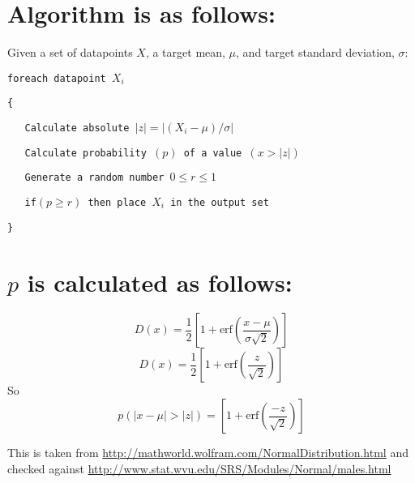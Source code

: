 \documentclass{article}
\begin{document}
\section{Algorithm is as follows:}
Given a set of datapoints $X$, a target mean, $\mu$, and target
standard deviation, $\sigma$:

\texttt{foreach datapoint $X_i$}

\texttt{\{}

\texttt{\ \ \ Calculate absolute $|z| = |(X_i - \mu) / \sigma|$}

\texttt{\ \ \ Calculate probability $(p)$ of a value $(x > |z|)$}

\texttt{\ \ \ Generate a random number $0\le r\le 1$}

\texttt{\ \ \ if$(p \ge r)$ then place $X_i$ in the output set}

\texttt{\}}

\section{$p$ is calculated as follows:}
\begin{equation}
   D(x) = \frac{1}{2}\left[1 + 
                     \mbox{erf}\left(\frac{x-\mu}{\sigma\sqrt{2}}\right)\right]
\end{equation}
\begin{equation}
   D(x)  = \frac{1}{2}\left[1 + 
                     \mbox{erf}\left(\frac{z}{\sqrt{2}}\right)\right]
\end{equation}
   So 
\begin{equation}
   p(|x-\mu| > |z|) = \left[1 + 
                      \mbox{erf}\left(\frac{-z}{\sqrt{2}}\right)\right]
\end{equation}

This is taken from
\url{http://mathworld.wolfram.com/NormalDistribution.html} and checked
against \url{http://www.stat.wvu.edu/SRS/Modules/Normal/males.html}
\end{document}
